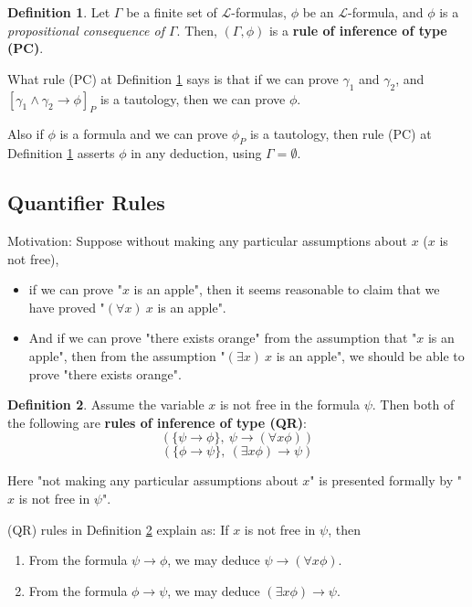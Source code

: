 \documentclass[11pt,letterpaper]{book}
\theoremstyle{definition}
\newtheorem{definition}{Definition}[section]
\begin{document}
\begin{definition}\label{def:infer_rule_PC}
Let $\Gamma$ be a finite set of $\mathcal{L}$-formulas, $\phi$ be an
$\mathcal{L}$-formula, and $\phi$ is a \emph{propositional consequence
of $\Gamma$}. Then, $(\Gamma, \phi)$ is a \textbf{rule of inference of
type (PC)}.
\end{definition}


What rule (PC) at Definition \ref{def:infer_rule_PC} says is that if we
can prove $\gamma_1$ and $\gamma_2$, and $[\gamma_1 \land \gamma_2
\rightarrow \phi ]_P$ is a tautology, then we can prove $\phi$.

Also if $\phi$ is a formula and we can prove $\phi_P$ is a tautology,
then rule  (PC) at Definition \ref{def:infer_rule_PC} asserts $\phi$ in
any deduction, using $\Gamma = \emptyset$.


\subsection{Quantifier Rules}



Motivation: Suppose without making any particular assumptions about $x$
($x$ is not free),
\begin{itemize}
\item{if we can prove "$x$ is an apple", then it seems reasonable to
claim that we have proved "$(\forall x)\ x$ is an apple". }
\item{And if we can prove "there exists orange" from the assumption that
"$x$ is an apple", then from the assumption "$(\exists x)\ x$ is an
apple", we should be able to prove "there exists orange". }
\end{itemize}



\begin{definition}\label{def:infer_rule_QR}
Assume the variable $x$ is not free in the formula $\psi$. Then both of
the following are \textbf{rules of inference of type (QR)}:
$$( \{ \psi \rightarrow \phi \},\ \psi \rightarrow (\forall x \phi ) ) $$
$$( \{ \phi \rightarrow \psi \},\ (\exists x \phi) \rightarrow \psi ) $$

\end{definition}


Here "not making any particular assumptions about $x$" is presented
formally by "$x$ is not free in $\psi$".

(QR) rules in Definition \ref{def:infer_rule_QR} explain as: If $x$ is
not free in $\psi$, then
\begin{enumerate}
\item{From the formula $\psi \rightarrow \phi$, we may deduce $\psi
\rightarrow (\forall x \phi)$.}
\item{From the formula $\phi \rightarrow \psi$, we may deduce $(\exists
x \phi )\rightarrow \psi$.}
\end{enumerate}
\end{document}
